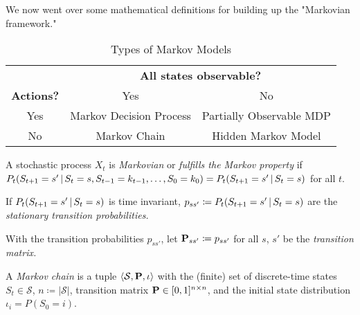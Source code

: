 		We now went over some mathematical definitions for building up the "Markovian framework."

		\begin{table}
			\centering
			\begin{tabular}{c|cc}
				\toprule
				                  & \multicolumn{2}{c}{\textbf{All states observable?}} \\
				\textbf{Actions?} & Yes                     & No                        \\ \midrule
				Yes               & Markov Decision Process & Partially Observable MDP  \\
				No                & Markov Chain            & Hidden Markov Model       \\ \bottomrule
			\end{tabular}
			\caption{Types of Markov Models}
			\label{tab:markovModels}
		\end{table}

		\begin{definition}
			A stochastic process \(X_t\) is \emph{Markovian} or \emph{fulfills the Markov property} if \( P_t(S_{t + 1} = s' \,\vert\, S_t = s, S_{t - 1} = k_{t - 1}, \dots, S_0 = k_0) = P_t(S_{t + 1} = s' \,\vert\, S_t = s) \) for all \(t\).
		\end{definition}

		\begin{definition}
			If \( P_t(S_{t + 1} = s' \,\vert\, S_t = s) \) is time invariant, \( p_{ss'} \coloneqq P_t(S_{t + 1} = s' \,\vert\, S_t = s) \) are the \emph{stationary transition probabilities.}
		\end{definition}

		\begin{definition}
			With the transition probabilities \(p_{ss'}\), let \( \bm{\mathrm{P}}_{ss'} \coloneqq p_{ss'} \) for all \(s\), \(s'\) be the \emph{transition matrix.}
		\end{definition}

		\begin{definition}
			A \emph{Markov chain} is a tuple \( \langle \mathcal{S}, \bm{\mathrm{P}}, \iota \rangle \) with the (finite) set of discrete-time states \(S_t \in \mathcal{S}\), \( n \coloneqq \lvert \mathcal{S} \rvert \), transition matrix \( \bm{\mathrm{P}} \in [0, 1]^{n \times n} \), and the initial state distribution \( \iota_i = P(S_0 = i) \).
		\end{definition}

